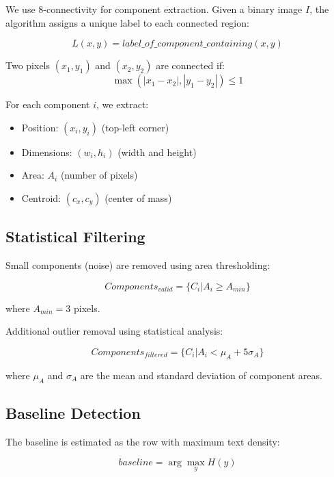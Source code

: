 \documentclass[12pt,a4paper,oneside]{report}
\begin{document}
We use 8-connectivity for component extraction. Given a binary image $I$, the algorithm assigns a unique label to each connected region:

\begin{equation}
    L(x, y) = label\_of\_component\_containing(x, y)
\end{equation}

Two pixels $(x_1, y_1)$ and $(x_2, y_2)$ are connected if:
\begin{equation}
    \max(|x_1 - x_2|, |y_1 - y_2|) \leq 1
\end{equation}

For each component $i$, we extract:
\begin{itemize}
    \item Position: $(x_i, y_i)$ (top-left corner)
    \item Dimensions: $(w_i, h_i)$ (width and height)
    \item Area: $A_i$ (number of pixels)
    \item Centroid: $(c_x, c_y)$ (center of mass)
\end{itemize}

\subsection{Statistical Filtering}

Small components (noise) are removed using area thresholding:

\begin{equation}
    Components_{valid} = \{C_i | A_i \geq A_{min}\}
\end{equation}

where $A_{min} = 3$ pixels.

Additional outlier removal using statistical analysis:

\begin{equation}
    Components_{filtered} = \{C_i | A_i < \mu_A + 5\sigma_A\}
\end{equation}

where $\mu_A$ and $\sigma_A$ are the mean and standard deviation of component areas.

\subsection{Baseline Detection}

The baseline is estimated as the row with maximum text density:

\begin{equation}
    baseline = \arg\max_y H(y)
\end{equation}
\end{document}
